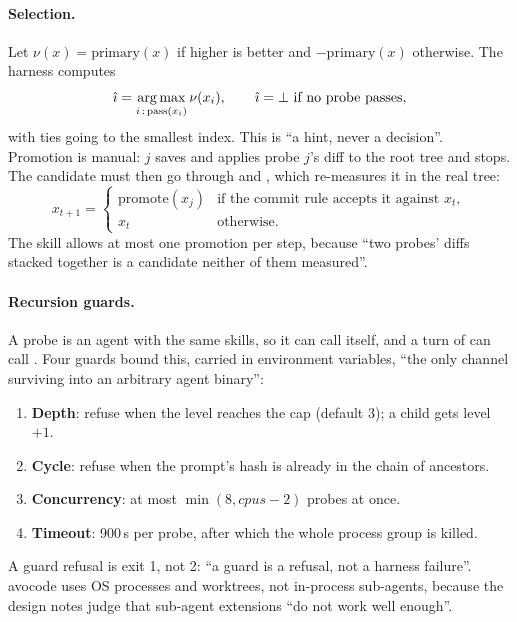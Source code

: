 \paragraph{Selection.} Let $\nu(x) = \mathrm{primary}(x)$ if higher is better and $-\mathrm{primary}(x)$
otherwise. The harness computes
\begin{equation}
  \hat{\imath} = \operatorname*{arg\,max}_{i\,:\,\mathrm{pass}(x_i)} \nu(x_i),
  \qquad \hat{\imath} = \bot \text{ if no probe passes},
\end{equation}
with ties going to the smallest index. This is ``a hint, never a decision''. Promotion is manual:
 $j$ saves and applies probe $j$'s diff to the root tree and stops. The candidate
must then go through  and , which re-measures it in the real tree:
\begin{equation}
  x_{t+1} =
  \begin{cases}
    \mathrm{promote}(x_j) & \text{if the commit rule accepts it against } x_t,\\
    x_t & \text{otherwise.}
  \end{cases}
\end{equation}
The skill allows at most one promotion per step, because ``two probes' diffs stacked together is a
candidate neither of them measured''.

\paragraph{Recursion guards.} A probe is an agent with the same skills, so it can call 
itself, and a turn of  can call . Four guards bound this, carried in environment
variables, ``the only channel surviving  into an arbitrary agent binary'':
\begin{enumerate}[leftmargin=*,itemsep=1pt]
  \item \textbf{Depth}: refuse when the level reaches the cap (default 3); a child gets level $+1$.
  \item \textbf{Cycle}: refuse when the prompt's hash is already in the chain of ancestors.
  \item \textbf{Concurrency}: at most $\min(8, \mathit{cpus} - 2)$ probes at once.
  \item \textbf{Timeout}: 900\,s per probe, after which the whole process group is killed.
\end{enumerate}
A guard refusal is exit 1, not 2: ``a guard is a refusal, not a harness failure''. avocode uses OS
processes and worktrees, not in-process sub-agents, because the design notes judge that sub-agent
extensions ``do not work well enough''.

